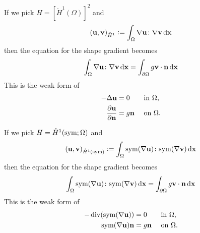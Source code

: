 \documentclass[aspectratio=1610]{beamer}
\begin{document}
\begin{frame}
    \begin{example}
        If we pick $H=[\mathring{H}^1(\Omega)]^2$ and 
            \begin{equation}
                (\mathbf{u}, \mathbf{v})_{\mathring{H}^1} \vcentcolon= \int_{\Omega} \nabla \mathbf{u}\colon \nabla \mathbf{v} \operatorname{d}\!{\mathbf{x}}
            \end{equation}
            then the equation for the shape gradient becomes
            \begin{equation}
                \int_{\Omega} \nabla \mathbf{u}\colon \nabla \mathbf{v} \operatorname{d}\!{\mathbf{x}} = \int_{\partial\Omega} g\mathbf{v}\cdot\mathbf{n}\operatorname{d}\!{\mathbf{x}}
            \end{equation}
            This is the weak form of 
            \begin{equation}
                \begin{aligned}
                    - \Delta \mathbf{u} &= 0 && \text{ in }\Omega,\\
                    \frac{\partial\mathbf{u}}{\partial\mathbf{n}} &= g\mathbf{n} && \text{ on }\Omega.
                \end{aligned}
            \end{equation}
    \end{example}
\end{frame}
\begin{frame}
    \begin{example}
        If we pick $H=\mathring{H}^1(\mathrm{sym}; \Omega)$ and 
            \begin{equation}
                (\mathbf{u}, \mathbf{v})_{\mathring{H}^1(\mathrm{sym})} \vcentcolon= \int_{\Omega} \mathrm{sym}(\nabla \mathbf{u})\colon \mathrm{sym}(\nabla \mathbf{v}) \operatorname{d}\!{\mathbf{x}}
            \end{equation}
            then the equation for the shape gradient becomes
            \begin{equation}
                \int_{\Omega} \mathrm{sym}(\nabla \mathbf{u})\colon \mathrm{sym}(\nabla \mathbf{v}) \operatorname{d}\!{\mathbf{x}} = \int_{\partial\Omega} g\mathbf{v}\cdot\mathbf{n}\operatorname{d}\!{\mathbf{x}}
            \end{equation}
            This is the weak form of 
            \begin{equation}
                \begin{aligned}
                    - \operatorname{div}(\mathrm{sym}(\nabla \mathbf{u})) &= 0 && \text{ in }\Omega,\\
                    \mathrm{sym}(\nabla \mathbf{u}) \mathbf{n} &= g\mathbf{n} && \text{ on }\Omega.
                \end{aligned}
            \end{equation}
    \end{example}
\end{frame}
\end{document}
